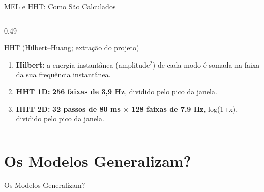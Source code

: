 \documentclass[aspectratio=169]{beamer}
\begin{document}
\begin{frame}{MEL e HHT: Como São Calculados}
\begin{columns}[T]
\begin{column}{0.49\textwidth}
\begin{block}{\small HHT (Hilbert--Huang; extração do projeto)}
\begin{enumerate}
                    \item \textbf{Hilbert:} a energia instantânea (amplitude$^2$) de cada modo é somada na faixa da sua frequência instantânea.
                    \item \textbf{HHT 1D:} \textbf{256 faixas de 3,9 Hz}, dividido pelo pico da janela.
                    \item \textbf{HHT 2D:} \textbf{32 passos de 80 ms $\times$ 128 faixas de 7,9 Hz}, log(1+x), dividido pelo pico da janela.                \end{enumerate}
            \end{block}
        \end{column}
    \end{columns}
\end{frame}

\section{Os Modelos Generalizam?}

\begin{frame}
    \centering
    \huge Os Modelos Generalizam?
\end{frame}
\end{document}
